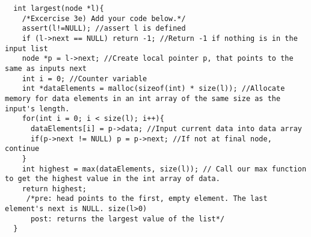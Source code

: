 \documentclass{article}
\begin{document}
\begin{lstlisting}
  int largest(node *l){
    /*Excercise 3e) Add your code below.*/
    assert(l!=NULL); //assert l is defined
    if (l->next == NULL) return -1; //Return -1 if nothing is in the input list
    node *p = l->next; //Create local pointer p, that points to the same as inputs next
    int i = 0; //Counter variable
    int *dataElements = malloc(sizeof(int) * size(l)); //Allocate memory for data elements in an int array of the same size as the input's length.
    for(int i = 0; i < size(l); i++){
      dataElements[i] = p->data; //Input current data into data array
      if(p->next != NULL) p = p->next; //If not at final node, continue
    }
    int highest = max(dataElements, size(l)); // Call our max function to get the highest value in the int array of data.
    return highest; 
     /*pre: head points to the first, empty element. The last element's next is NULL. size(l>0)
      post: returns the largest value of the list*/
  }
\end{lstlisting}


\vspace{2pt}
\end{document}
